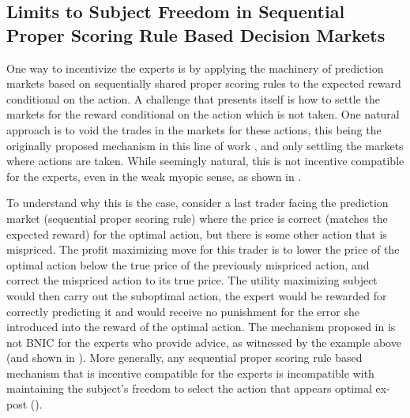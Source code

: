 \subsection{Limits to Subject Freedom in Sequential Proper Scoring Rule Based Decision Markets}

One way to incentivize the experts is by applying the machinery of prediction markets based on sequentially shared proper scoring rules to the expected reward conditional on the action.
A challenge that presents itself is how to settle the markets for the reward conditional on the action which is not taken.
One natural approach is to void the trades in the markets for these actions, this being the originally proposed mechanism in this line of work \cite{hanson2002decision}, and only settling the markets where actions are taken.
While seemingly natural, this is not incentive compatible for the experts, even in the weak myopic sense, as shown in \cite{othman2010decision}. 

To understand why this is the case, consider a last trader facing the prediction market (sequential proper scoring rule)  where the  price is correct (matches the expected reward) for the optimal action, but there is some other action that is mispriced. The profit maximizing move for this trader is to lower the price of the optimal action below the true price of the previously mispriced action, and correct the mispriced action to its true  price. 
The utility maximizing subject would then carry out the suboptimal action, the expert would be rewarded for correctly predicting it and would receive no punishment for the error she introduced into the reward of the optimal action. 
The mechanism proposed in \cite{hanson2002decision} is not BNIC for the experts who provide advice, as witnessed by the example above (and shown in \cite{othman2010decision,chen2014eliciting}).
More generally, any sequential proper scoring rule based mechanism that is incentive compatible for the experts is incompatible with maintaining the subject's freedom to select the action that appears optimal ex-post (\cite{ chen2014eliciting}). 



